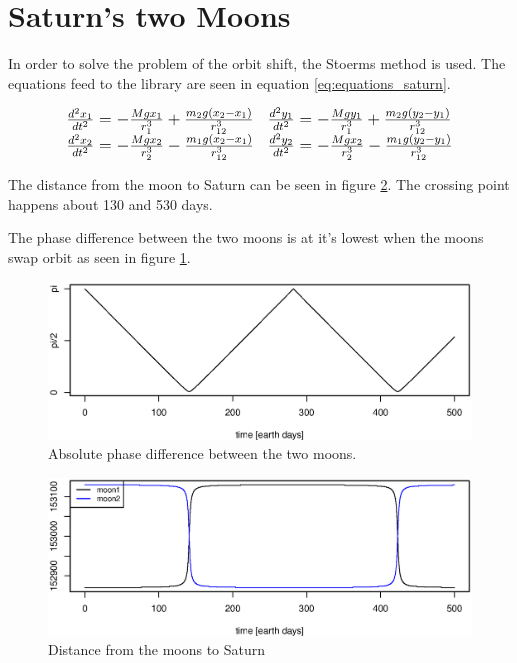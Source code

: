 \section{Saturn's two Moons}
In order to solve the problem of the orbit shift, the Stoerms method is used.
The equations feed to the library are seen in equation \ref{eq:equations_saturn}.

\begin{equation}
\large{
\begin{array}{ll}
\frac{d^2x_1}{dt^2} = - \frac{M g x_1}{r_1^3} + \frac{m_2 g (x_2 - x_1)}{r_{12}^3} &
\frac{d^2y_1}{dt^2} = - \frac{M g y_1}{r_1^3} + \frac{m_2 g (y_2 - y_1)}{r_{12}^3}\\
\frac{d^2x_2}{dt^2} = - \frac{M g x_2}{r_2^3} - \frac{m_1 g (x_2 - x_1)}{r_{12}^3} &
\frac{d^2y_2}{dt^2} = - \frac{M g x_2}{r_2^3} - \frac{m_1 g (y_2 - y_1)}{r_{12}^3}
\end{array}
}
\label{eq:equations_saturn}
\end{equation}

The distance from the moon to Saturn can be seen in figure \ref{fig:distance}.
The crossing point happens about 130 and 530 days.

The phase difference between the two moons is at it's lowest when the moons swap orbit as seen in figure \ref{fig:angle}.

\begin{figure}[h]
\centering
\includegraphics[width=\textwidth]{graphics/angle}
\caption{Absolute phase difference between the two moons.}
\label{fig:angle}
\end{figure}

\begin{figure}[h]
   \centering
\includegraphics[width=\textwidth]{graphics/distance}
\caption{Distance from the moons to Saturn}
\label{fig:distance}
\end{figure}

